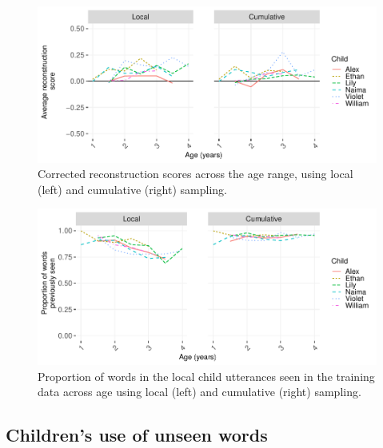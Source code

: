 \documentclass[
  english,
  man,mask,floatsintext]{apa6}
\begin{document}
\begin{figure}
\includegraphics[width=0.95\linewidth]{CBL-age_invariance_files/figure-latex/fig6-1} \caption{Corrected reconstruction scores across the age range, using local (left) and cumulative (right) sampling.}\label{fig:fig6}
\end{figure}

\begin{figure}
\includegraphics[width=0.95\linewidth]{CBL-age_invariance_files/figure-latex/fig7-1} \caption{Proportion of words in the local child utterances seen in the training data across age using local (left) and cumulative (right) sampling.}\label{fig:fig7}
\end{figure}

\hypertarget{childrens-use-of-unseen-words}{%
\subsection{Children's use of unseen words}\label{childrens-use-of-unseen-words}}
\end{document}
